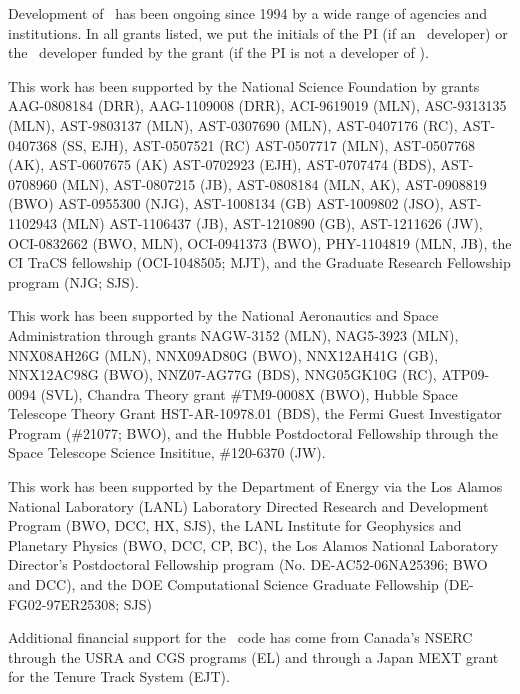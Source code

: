 
\acknowledgments

Development of \enzo\ has been ongoing since 1994 by a wide range of
agencies and institutions.  In all grants listed, we put the
initials of the PI (if an \enzo\ developer) or the \enzo\ developer
funded by the grant (if the PI is not a developer of \enzo).

This work has been supported by the National Science Foundation by
grants
AAG-0808184 (DRR),
AAG-1109008 (DRR),
ACI-9619019 (MLN),
ASC-9313135 (MLN),
AST-9803137 (MLN), 
AST-0307690 (MLN), 
AST-0407176 (RC),
AST-0407368 (SS, EJH),
AST-0507521 (RC) 
AST-0507717 (MLN), 
AST-0507768 (AK),
AST-0607675 (AK)
AST-0702923 (EJH),
AST-0707474 (BDS), 
AST-0708960 (MLN), 
AST-0807215 (JB),
AST-0808184 (MLN, AK),
AST-0908819 (BWO) 
AST-0955300 (NJG),
AST-1008134 (GB) 
AST-1009802 (JSO), 
AST-1102943 (MLN)
AST-1106437 (JB),
AST-1210890 (GB),
AST-1211626 (JW),
OCI-0832662 (BWO, MLN),
OCI-0941373 (BWO),
PHY-1104819 (MLN, JB),
the CI TraCS fellowship (OCI-1048505; MJT),
and the Graduate Research Fellowship program (NJG; SJS).

This work has been supported by the National Aeronautics and Space
Administration through grants
NAGW-3152 (MLN),
NAG5-3923 (MLN),
NNX08AH26G (MLN),
NNX09AD80G (BWO),
NNX12AH41G (GB),
NNX12AC98G (BWO),
NNZ07-AG77G (BDS),
NNG05GK10G (RC),
ATP09-0094 (SVL),
Chandra Theory grant \#TM9-0008X (BWO),
Hubble Space Telescope Theory Grant HST-AR-10978.01 (BDS),
the Fermi Guest Investigator Program (\#21077; BWO),
and the Hubble Postdoctoral Fellowship through the Space Telescope Science
Insititue, \#120-6370 (JW).

This work has been supported by the Department of Energy via the
Los Alamos National Laboratory (LANL) Laboratory Directed Research and
Development Program (BWO, DCC, HX, SJS), 
the LANL Institute for Geophysics and Planetary Physics (BWO, DCC, CP,
BC),
the Los Alamos National Laboratory Director's Postdoctoral Fellowship
program (No. DE-AC52-06NA25396;
BWO and DCC), and the
DOE Computational Science Graduate Fellowship (DE-FG02-97ER25308; SJS)

Additional financial support for the \enzo\ code has come from
Canada's NSERC through the USRA and CGS programs (EL) and through a 
Japan MEXT grant for the Tenure Track System (EJT).

